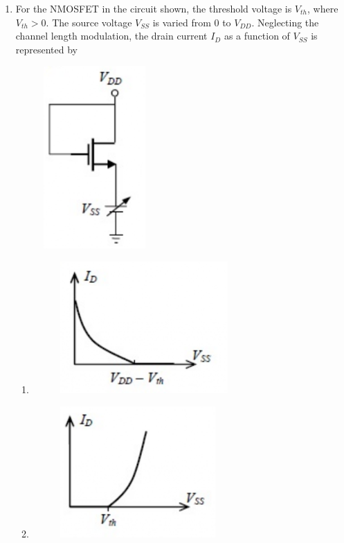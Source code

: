 \documentclass[a4paper, 11pt]{article}
\begin{document}
\begin{enumerate}
    \item For the NMOSFET in the circuit shown, the threshold voltage is $V_{th}$, where $V_{th}>0$. The source voltage $V_{SS}$ is varied from 0 to $V_{DD}$. Neglecting the channel length modulation, the drain current $I_{D}$ as a function of $V_{SS}$ is represented by
    \begin{figure}[H]
        \centering
        \includegraphics[width=0.3\columnwidth]{figs/q49.png}
        \caption*{}
        \label{fig:q49}
    \end{figure}
    \begin{enumerate}
        \item \begin{figure}[H]\centering\includegraphics[width=0.4\columnwidth]{figs/q49A.png}\end{figure}
        \item \begin{figure}[H]\centering\includegraphics[width=0.4\columnwidth]{figs/q49B.png}\end{figure}

\end{enumerate}
\end{enumerate}
\end{document}
